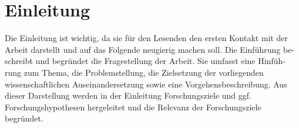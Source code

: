 
\section{Einleitung}

Die Einleitung ist wichtig, da sie für den Lesenden den ersten Kontakt mit der Arbeit darstellt und auf das Folgende neugierig machen soll. Die Einführung be- schreibt und begründet die Fragestellung der Arbeit. Sie umfasst eine Hinfüh- rung zum Thema, die Problemstellung, die Zielsetzung der vorliegenden wissenschaftlichen Auseinandersetzung sowie eine Vorgehensbeschreibung. Aus dieser Darstellung werden in der Einleitung Forschungsziele und ggf. Forschungshypothesen hergeleitet und die Relevanz der Forschungsziele begründet. \parencite{brooksbankCognitiveDissonanceRevisited2020}

\newpage